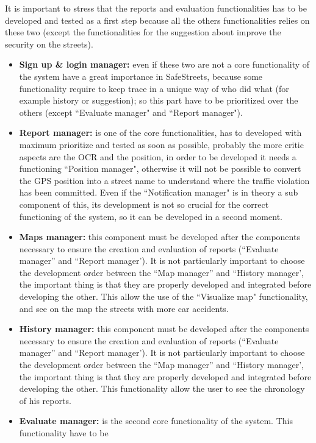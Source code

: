 \documentclass[12pt,a4paper]{report}
\begin{document}
			\newpage
			It is important to stress that the reports and evaluation functionalities has to be developed and tested
			as a first step because all the others functionalities relies on these two (except the functionalities for the suggestion
			about improve the security on the streets).
			\begin{itemize}
				\item \textbf{Sign up \& login manager:} even if these two are not a core functionality of the system have a
					great importance in SafeStreets, because some functionality require to keep trace in a unique way of
					who did what (for example history or suggestion); so this part have to be prioritized over the others
					(except ``Evaluate manager" and ``Report manager"). 
				\item \textbf{Report manager:} is one of the core functionalities, has to developed with maximum prioritize
					and tested as soon as possible, probably the more critic aspects are the OCR and the position, in order
					to be developed it needs a functioning ``Position manager", otherwise it will not be possible to convert
					the GPS position into a street name to understand where the traffic violation has been committed.
					Even if the ``Notification manager"  is in theory a sub component of this, its development is not so
					crucial for the correct functioning of the system, so it can be developed in a second moment.  
				\item \textbf{Maps manager:}  this component must be developed after the components necessary to
					ensure the creation and evaluation of reports (``Evaluate manager'' and ``Report manager'). It is not
					particularly important to choose the development order between the ``Map manager'' and ``History
					manager', the important thing is that they are properly developed and integrated before developing
					the other. This allow the use of the ``Visualize map" functionality, and see on the map the streets with
					more car accidents.
				\item \textbf{History manager:}  this component must be developed after the components necessary to
					ensure the creation and evaluation of reports (``Evaluate manager'' and ``Report manager'). It is not
					particularly important to choose the development order between the ``Map manager'' and ``History
					manager', the important thing is that they are properly developed and integrated before developing
					the other. This functionality allow the user to see the chronology of his reports.
				\item \textbf{Evaluate manager:} is the second core functionality of the system. This functionality have to be

\end{itemize}
\end{document}

